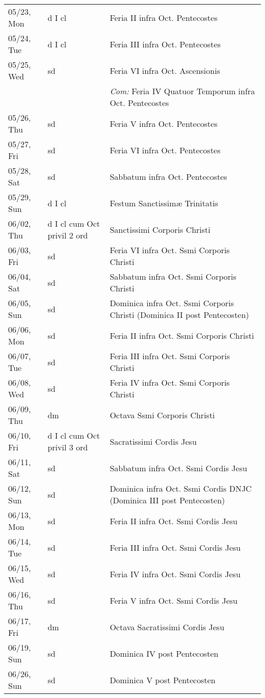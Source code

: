 \documentclass[10pt]{article}
\begin{document}
\begin{longtable}{ l l l }
05/23, Mon & d I cl & Feria II infra Oct. Pentecostes\\
05/24, Tue & d I cl & Feria III infra Oct. Pentecostes\\
05/25, Wed & sd & Feria VI infra Oct. Ascensionis\\
 & & \textit{Com:} Feria IV Quatuor Temporum infra Oct. Pentecostes\\
05/26, Thu & sd & Feria V infra Oct. Pentecostes\\
05/27, Fri & sd & Feria VI infra Oct. Pentecostes\\
05/28, Sat & sd & Sabbatum infra Oct. Pentecostes\\
05/29, Sun & d I cl & Festum Sanctissimæ Trinitatis\\
06/02, Thu & d I cl cum Oct privil 2 ord & Sanctissimi Corporis Christi\\
06/03, Fri & sd & Feria VI infra Oct. Ssmi Corporis Christi\\
06/04, Sat & sd & Sabbatum infra Oct. Ssmi Corporis Christi\\
06/05, Sun & sd & Dominica infra Oct. Ssmi Corporis Christi (Dominica II post Pentecosten)\\
06/06, Mon & sd & Feria II infra Oct. Ssmi Corporis Christi\\
06/07, Tue & sd & Feria III infra Oct. Ssmi Corporis Christi\\
06/08, Wed & sd & Feria IV infra Oct. Ssmi Corporis Christi\\
06/09, Thu & dm & Octava Ssmi Corporis Christi\\
06/10, Fri & d I cl cum Oct privil 3 ord & Sacratissimi Cordis Jesu\\
06/11, Sat & sd & Sabbatum infra Oct. Ssmi Cordis Jesu\\
06/12, Sun & sd & Dominica infra Oct. Ssmi Cordis DNJC (Dominica III post Pentecosten)\\
06/13, Mon & sd & Feria II infra Oct. Ssmi Cordis Jesu\\
06/14, Tue & sd & Feria III infra Oct. Ssmi Cordis Jesu\\
06/15, Wed & sd & Feria IV infra Oct. Ssmi Cordis Jesu\\
06/16, Thu & sd & Feria V infra Oct. Ssmi Cordis Jesu\\
06/17, Fri & dm & Octava Sacratissimi Cordis Jesu\\
06/19, Sun & sd & Dominica IV post Pentecosten\\
06/26, Sun & sd & Dominica V post Pentecosten\\

\end{longtable}
\end{document}
